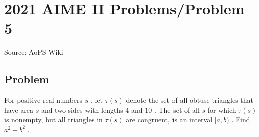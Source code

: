 \documentclass[12pt]{article}
\begin{document}
\section*{{2021 AIME II Problems/Problem 5}}
Source: AoPS Wiki

\subsection*{Problem}
For positive real numbers $s$ , let $\tau(s)$ denote the set of all obtuse triangles that have area $s$ and two sides with lengths $4$ and $10$ . The set of all $s$ for which $\tau(s)$ is nonempty, but all triangles in $\tau(s)$ are congruent, is an interval $[a,b)$ . Find $a^2+b^2$ .
\end{document}
